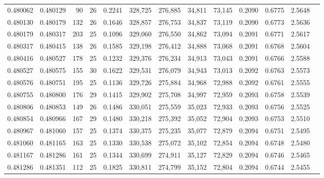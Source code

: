 \begin{tabular}{rrrrrrrrrrrrr}
0.480062 & 0.480129 &  90 &  26 &                                     0.2241 & 328,725 & 276,885 &  34,811 &  73,145 & 0.2090 & 0.6775 & 2.5648 \\
0.480130 & 0.480179 & 132 &  26 &                                     0.1646 & 328,857 & 276,753 &  34,837 &  73,119 & 0.2090 & 0.6773 & 2.5636 \\
0.480179 & 0.480317 & 203 &  25 &                                     0.1096 & 329,060 & 276,550 &  34,862 &  73,094 & 0.2091 & 0.6771 & 2.5617 \\
0.480317 & 0.480415 & 138 &  26 &                                     0.1585 & 329,198 & 276,412 &  34,888 &  73,068 & 0.2091 & 0.6768 & 2.5604 \\
0.480416 & 0.480527 & 178 &  25 &                                     0.1232 & 329,376 & 276,234 &  34,913 &  73,043 & 0.2091 & 0.6766 & 2.5588 \\
0.480527 & 0.480575 & 155 &  30 &                                     0.1622 & 329,531 & 276,079 &  34,943 &  73,013 & 0.2092 & 0.6763 & 2.5573 \\
0.480576 & 0.480751 & 195 &  25 &                                     0.1136 & 329,726 & 275,884 &  34,968 &  72,988 & 0.2092 & 0.6761 & 2.5555 \\
0.480755 & 0.480800 & 176 &  29 &                                     0.1415 & 329,902 & 275,708 &  34,997 &  72,959 & 0.2093 & 0.6758 & 2.5539 \\
0.480806 & 0.480853 & 149 &  26 &                                     0.1486 & 330,051 & 275,559 &  35,023 &  72,933 & 0.2093 & 0.6756 & 2.5525 \\
0.480854 & 0.480966 & 167 &  29 &                                     0.1480 & 330,218 & 275,392 &  35,052 &  72,904 & 0.2093 & 0.6753 & 2.5510 \\
0.480967 & 0.481060 & 157 &  25 &                                     0.1374 & 330,375 & 275,235 &  35,077 &  72,879 & 0.2094 & 0.6751 & 2.5495 \\
0.481060 & 0.481165 & 163 &  25 &                                     0.1330 & 330,538 & 275,072 &  35,102 &  72,854 & 0.2094 & 0.6748 & 2.5480 \\
0.481167 & 0.481286 & 161 &  25 &                                     0.1344 & 330,699 & 274,911 &  35,127 &  72,829 & 0.2094 & 0.6746 & 2.5465 \\
0.481286 & 0.481351 & 112 &  25 &                                     0.1825 & 330,811 & 274,799 &  35,152 &  72,804 & 0.2094 & 0.6744 & 2.5455 \\

\end{tabular}
